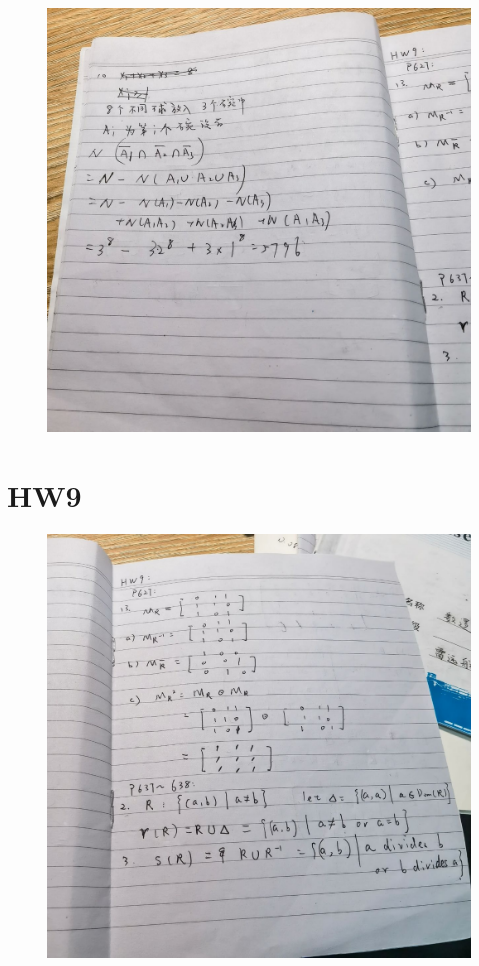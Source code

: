 \documentclass{article}
\begin{document}
    \begin{figure}[H]
    \centering
    \includegraphics[width=1\textwidth]{IMG_20221205_183702.jpg}
    \caption{\label{Lab9}}
    \end{figure}
        



\section*{HW9}

\begin{figure}[H]
    \centering
    \includegraphics[width=1\textwidth]{hw9/IMG_20221205_183705.jpg}
    \caption{\label{Lab9}}
    \end{figure}
\end{document}
